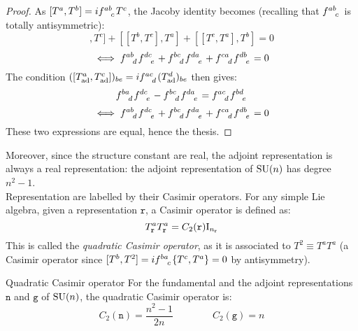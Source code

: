 \begin{proofbox}
  \begin{proof}
    As $ [T^a,T^b] = i \tensor{f}{^a^b_c} T^c $, the Jacoby identity becomes (recalling that $ \tensor{f}{^a^b_c} $ is totally antisymmetric):
    \begin{equation*}
      [[T^a,T^b],T^c] + [[T^b,T^c],T^a] + [[T^c,T^a],T^b] = 0
    \end{equation*}
    \begin{equation*}
      \iff \tensor{f}{^a^b_d} \tensor{f}{^d^c_e} + \tensor{f}{^b^c_d} \tensor{f}{^d^a_e} + \tensor{f}{^c^a_d} \tensor{f}{^d^b_e} = 0
    \end{equation*}
    The condition $ ([T^a_\text{ad},T^c_\text{ad}])_{be} = i \tensor{f}{^a^c_d} (T^d_\text{ad})_{be} $ then gives:
    \begin{equation*}
      \tensor{f}{^b^a_d} \tensor{f}{^d^c_e} - \tensor{f}{^b^c_d} \tensor{f}{^d^a_e} = \tensor{f}{^a^c_d} \tensor{f}{^b^d_e}
    \end{equation*}
    \begin{equation*}
      \iff \tensor{f}{^a^b_d} \tensor{f}{^d^c_e} + \tensor{f}{^b^c_d} \tensor{f}{^d^a_e} + \tensor{f}{^c^a_d} \tensor{f}{^d^b_e} = 0
    \end{equation*}
    These two expressions are equal, hence the thesis.
  \end{proof}
\end{proofbox}

Moreover, since the structure constant are real, the adjoint representation is always a real representation: the adjoint representation of $ \mathrm{SU}(n) $ has degree $ n^2 - 1 $.\\
Representation are labelled by their Casimir operators. For any simple Lie algebra, given a representation $ \mathtt{r} $, a Casimir operator is defined as:
\begin{equation}
  T^a_\mathtt{r} T^a_\mathtt{r} = C_2(\mathtt{r}) \mathrm{I}_{n_{\mathtt{r}}}
  \label{eq:quad-cas}
\end{equation}
This is called the \textit{quadratic Casimir operator}, as it is associated to $ T^2 \equiv T^a T^a $ (a Casimir operator since $ [T^b, T^2] = i \tensor{f}{^b^a_c} \{T^c,T^a\} = 0 $ by antisymmetry).

\begin{proposition}{Quadratic Casimir operator}{}
  For the fundamental and the adjoint representations $ \mathtt{n} $ and $ \mathtt{g} $ of $ \mathrm{SU}(n) $, the quadratic Casimir operator is:
  \begin{equation}
    C_2(\mathtt{n}) = \frac{n^2 - 1}{2n}
    \qquad \qquad
    C_2(\mathtt{g}) = n
  \end{equation}
\end{proposition}

